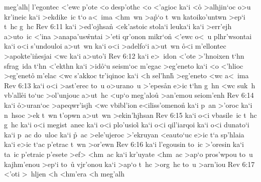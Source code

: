 meg'alh|
l'egontec
<'ewc
p'ote
<o
desp'othc
<o
<'agioc
ka`i
<o\r{}
>alhjin`oc
o>u
kr'ineic
ka`i
>ekdike~ic
t`o
a<~ima
<hm~wn
>a\r{p}`o
t~wn
katoiko'untwn
>ep`i
t~hc
g~hc\bibvsend
\vs Rev 6:11
ka`i
>ed'ojhsan\r{}
<ek'astoic
stola`i
leuka`i
ka`i
>err'ejh
a>uto~ic
<'ina
>anapa'us\r{w}ntai
>'eti
qr'onon
mikr`on\r{}
<'ewc
o<~u
plhr'wsontai
ka`i
o<i
s'undouloi
a>ut~wn
ka`i
o<i
>adelfo`i
a>ut~wn
\r{o}<i
m'ellontec
>apokte'i\r{n}esjai
<wc
ka`i
a>uto'i\bibvsend
\vs Rev 6:12
ka`i
e>~idon
<'ote
>'hnoixen
t`hn
sfrag~ida
t`hn
<'ekthn
ka`i
>id\r{o}`u
seism`oc
m'egac
>eg'eneto
ka`i
<o
<'hlioc
>eg'eneto\r{}
m'elac
<wc
s'akkoc
tr'iqinoc
ka`i
<h
sel'hn\r{h}
>eg'eneto
<wc
a<~ima\bibvsend
\vs Rev 6:13
ka`i
o<i
>ast'erec
to~u
o>urano~u
>'epes\r{a}n
e>ic
t`hn
g~hn
<wc
suk~h
vb'all\r{e}i
to`uc
>ol'unjouc
a>ut~hc
<up`o
meg'alou\r{}
>an'emou
seiom'enh\bibvsend
\vs Rev 6:14
ka`i
\r{o}>uran`oc
>apeqwr'isjh
<wc
vbibl'ion
e<iliss'omeno\r{n}
ka`i
p~an
>'oroc
ka`i
n~hsoc
>ek
t~wn
t'opwn
a>ut~wn
>ekin'hjhsan\bibvsend
\vs Rev 6:15
ka`i
o<i
vbasile~ic
t~hc
g~hc
ka`i
o<i
megist~anec
ka`i
o<i
plo'usioi\r{}
ka`i
o<i
qil'iarqoi
ka`i
o<i
dunato`i
ka`i
p~ac
do~uloc
ka`i
\r{p}~ac
>ele'ujeroc
>'ekruyan
<eauto`uc
e>ic
t`a
sp'hlaia
ka`i
e>ic
t`ac
p'etrac
t~wn
>or'ewn\bibvsend
\vs Rev 6:16
ka`i
l'egousin
to~ic
>'oresin
ka`i
ta~ic
p'etraic
p'esete
>ef>
<hm~ac
ka`i
kr'uyate
<hm~ac
>ap`o
pros'wpou
to~u
kajhm'enou
>ep`i
to~u\r{}
vjr'onou
ka`i
>ap`o
t~hc
>org~hc
to~u
>arn'iou\bibvsend
\vs Rev 6:17
<'oti
>~hljen
<h
<hm'era
<h
meg'alh
